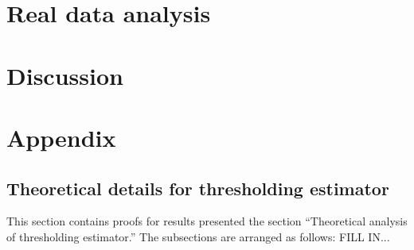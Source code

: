 \documentclass[12pt]{article}
\begin{document}
\section{Real data analysis}

\section{Discussion}

\section{Appendix}

\subsection{Theoretical details for thresholding estimator}

This section contains proofs for results presented the section ``Theoretical analysis of thresholding estimator.'' The subsections are arranged as follows: FILL IN...
\end{document}
